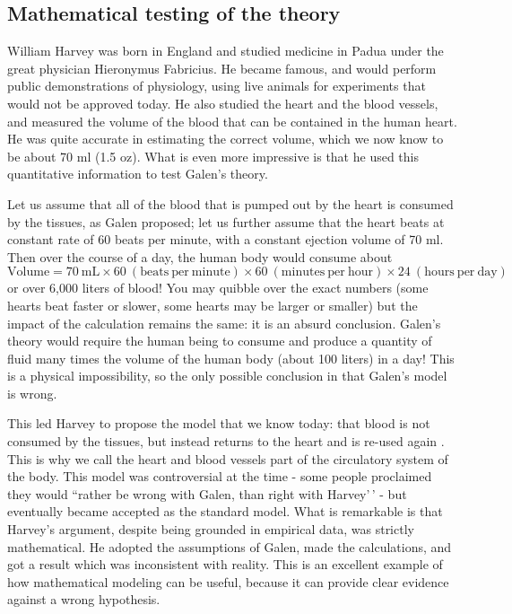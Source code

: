 \documentclass[
]{book}
\begin{document}
\hypertarget{mathematical-testing-of-the-theory}{%
\subsection{Mathematical testing of the theory}\label{mathematical-testing-of-the-theory}}

William Harvey  was born in England and studied medicine in Padua under the great physician Hieronymus Fabricius. He became famous, and would perform public demonstrations of physiology, using live animals for experiments that would not be approved today. He also studied the heart and the blood vessels, and measured the volume of the blood that can be contained in the human heart. He was quite accurate in estimating the correct volume, which we now know to be about 70 ml (1.5 oz). What is even more impressive is that he used this quantitative information to test Galen's theory.

Let us assume that all of the blood that is pumped out by the heart is consumed by the tissues, as Galen proposed; let us further assume that the heart beats at constant rate of 60 beats per minute, with a constant ejection volume of 70 ml. Then over the course of a day, the human body would consume about
\[\mathrm{Volume} = 70 \ \mathrm {mL} \times 60 \ \mathrm {(beats \ per \ minute)} \times 60 \ \mathrm {(minutes \ per \ hour)}  \times 24 \ \mathrm {(hours \ per \ day)}\]
or over 6,000 liters of blood! You may quibble over the exact numbers (some hearts beat faster or slower, some hearts may be larger or smaller) but the impact of the calculation remains the same: it is an absurd conclusion. Galen's theory would require the human being to consume and produce a quantity of fluid many times the volume of the human body (about 100 liters) in a day! This is a physical impossibility, so the only possible conclusion in that Galen's model is wrong.

This led Harvey to propose the model that we know today: that blood is not consumed by the tissues, but instead returns to the heart and is re-used again \citep{schultz_william_2002}. This is why we call the heart and blood vessels part of the circulatory system of the body. This model was controversial at the time - some people proclaimed they would ``rather be wrong with Galen, than right with Harvey'\,' - but eventually became accepted as the standard model. What is remarkable is that Harvey's argument, despite being grounded in empirical data, was strictly mathematical. He adopted the assumptions of Galen, made the calculations, and got a result which was inconsistent with reality. This is an excellent example of how mathematical modeling can be useful, because it can provide clear evidence against a wrong hypothesis.
\end{document}
